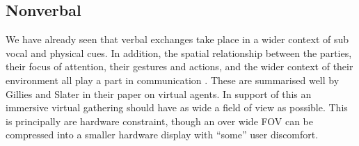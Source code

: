 \subsection{Nonverbal}
We have already seen that verbal exchanges take place in a wider context of sub vocal and physical cues. In addition, the spatial relationship between the parties, their focus of attention, their gestures and actions, and the wider context of their environment all play a part in communication \cite{Goodwin2000a}. These are summarised well by Gillies and Slater \cite{Gillies2005} in their paper on virtual agents. In support of this an immersive virtual gathering should have as wide a field of view as possible. This is principally are hardware constraint, though an over wide FOV can be compressed into a smaller hardware display with ``some'' user discomfort.\\

